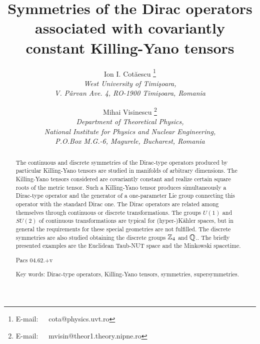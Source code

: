\documentclass[a4paper,12pt]{article}
\begin{document}


\newcommand{\Lor}{L^{\uparrow}_{+}}
\newtheorem{lem}{Lemma}
\newtheorem{defin}{Definition}
\newtheorem{theor}{Theorem}
\newtheorem{prop}{Proposition}
\newtheorem{cor}{Corollary}
\newenvironment{demo}
{\bgroup\par\smallskip\noindent{\it Proof: }}{\rule{0.5em}{0.5em}
\egroup}



\def\Eh{\mbox{\teneufm\char 83}}


\title{Symmetries of the Dirac operators associated with covariantly 
constant Killing-Yano tensors}

\author{Ion I. Cot\u aescu \thanks{E-mail:~~~cota@physics.uvt.ro}\\ 
{\small \it West University of Timi\c soara,}\\
       {\small \it V. P\^ arvan Ave. 4, RO-1900 Timi\c soara, Romania}
\and
Mihai Visinescu \thanks{E-mail:~~~mvisin@theor1.theory.nipne.ro}\\
{\small \it Department of Theoretical Physics,}\\
{\small \it National Institute for Physics and Nuclear Engineering,}\\
{\small \it P.O.Box M.G.-6, Magurele, Bucharest, Romania}}
\date{}

\maketitle

\begin{abstract}
The continuous and discrete symmetries of the Dirac-type operators produced 
by particular Killing-Yano tensors are studied in manifolds of arbitrary 
dimensions. The Killing-Yano tensors considered are covariantly 
constant and realize  certain square roots of the metric tensor. Such a 
Killing-Yano tensor produces simultaneously a Dirac-type operator and the 
generator of a one-parameter Lie group connecting this operator with the 
standard Dirac one. The Dirac operators are related among themselves through 
continuous or discrete transformations. The groups $U(1)$ and $SU(2)$  of 
continuous transformations are typical for (hyper-)K\"ahler spaces, but in 
general the requirements for these special geometries are not fulfilled. 
The discrete symmetries are also studied obtaining the discrete groups  
${\Bbb Z}_4$ and ${\Bbb Q}$.. The briefly presented examples are the 
Euclidean Taub-NUT space and the Minkowski spacetime.

Pacs 04.62.+v

Key words: Dirac-type operators, Killing-Yano tensors, 
symmetries, supersymmetries.
\end{abstract}
\end{document}
